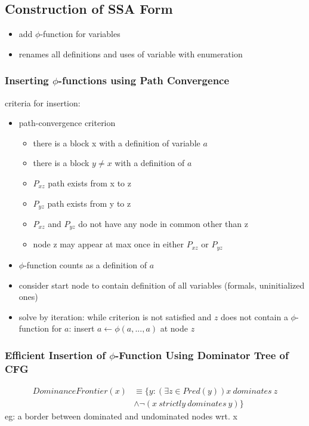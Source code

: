 \documentclass[8pt]{extarticle}
\begin{document}
\begin{multicols*}{2}
  \subsection{Construction of SSA Form}

  \begin{itemize}
  \item add $\phi$-function for variables
  \item renames all definitions and uses of variable with enumeration
  \end{itemize}

  \subsubsection{Inserting $\phi$-functions using Path Convergence}
  
  criteria for insertion:
  \begin{itemize}
  \item path-convergence criterion
    \begin{itemize}
    \item there is a block x with a definition of variable $a$
    \item there is a block $y \neq x$ with a definition of $a$
    \item $P_{xz}$ path exists from x to z
    \item $P_{yz}$ path exists from y to z
    \item $P_{xz}$ and $P_{yz}$ do not have any node in common other than z
    \item node z may appear at max once in either $P_{xz}$ or $P_{yz}$
    \end{itemize}
  \item $\phi$-function counts as a definition of $a$
  \item consider start node to contain definition of all variables (formals, uninitialized ones)
  \item solve by iteration: while criterion is not satisfied and $z$ does not contain a $\phi$-function for $a$: insert $a \leftarrow \phi(a, ..., a)$ at node $z$
  \end{itemize}

  \subsubsection{Efficient Insertion of $\phi$-Function Using Dominator Tree of CFG}

  \begin{align*}
    DominanceFrontier(x) & \equiv \{y: (\exists z \in Pred(y)) x\ dominates\ z\\
                         & \wedge \neg (x\ strictly\ dominates\ y)\}
  \end{align*}
  eg: a border between dominated and undominated nodes wrt. x


\end{multicols*}
\end{document}
